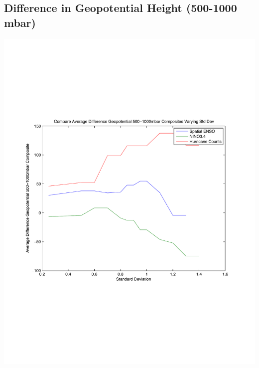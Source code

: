 \documentclass[11pt]{article}
\begin{document}
\subsection{Difference in Geopotential Height (500-1000 mbar)}
\includegraphics[scale = 0.6]{images/varyingStdDevForCompositesGeopotential500-1000mbar.pdf}

\newpage
\end{document}
